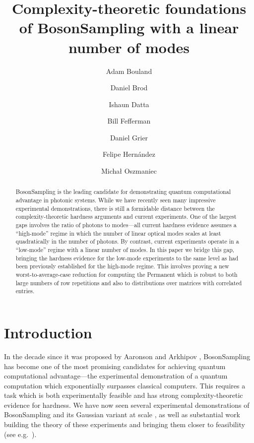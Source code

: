 \documentclass[11pt]{article}
\theoremstyle{plain}
\theoremstyle{plain}
\theoremstyle{plain}
\theoremstyle{plain}
\theoremstyle{plain}
\theoremstyle{plain}
\theoremstyle{plain}
\theoremstyle{remark}
\theoremstyle{remark}
\theoremstyle{plain}
\theoremstyle{plain}
\theoremstyle{plain}
\theoremstyle{plain}
\begin{document}
 	
 \title{Complexity-theoretic foundations of BosonSampling with a linear number of modes}
 \date{}
\author[1]{Adam Bouland}
\author[2]{Daniel Brod}
\author[1]{Ishaun Datta}
\author[3]{Bill Fefferman}
\author[4,5]{Daniel Grier}
\author[6]{Felipe Hern\'{a}ndez}
\author[7,8]{Micha\l{} Oszmaniec}



\maketitle	
\begin{abstract}
    BosonSampling is the leading candidate for demonstrating quantum computational advantage in photonic systems. While we have recently seen many impressive experimental demonstrations, there is still a formidable distance between the complexity-theoretic hardness arguments and current experiments.  One of the largest gaps involves the ratio of photons to modes---all current hardness evidence assumes a ``high-mode'' regime in which the number of linear optical modes scales at least quadratically in the number of photons.  By contrast, current experiments operate in a ``low-mode'' regime with a linear number of modes.  In this paper we bridge this gap, bringing the hardness evidence for the low-mode experiments to the same level as had been previously established for the high-mode regime.  This involves proving a new worst-to-average-case reduction for computing the Permanent which is robust to both large numbers of row repetitions and also to distributions over matrices with correlated entries.
\end{abstract}

\section{Introduction}\label{sec:intro}

In the decade since it was proposed by Aaronson and Arkhipov \cite{Aaronson2013}, BosonSampling has become one of the most promising candidates for achieving quantum computational advantage---the experimental demonstration of a quantum computation which exponentially surpasses classical computers. This requires a task which is both experimentally feasible and has strong complexity-theoretic evidence for hardness. We have now seen several experimental demonstrations of BosonSampling \cite{wang2019boson} and its Gaussian variant at scale \cite{GaussBSExperiment2020, zhong2021phase, madsen2022quantum}, as well as substantial work building the theory of these experiments and bringing them closer to feasibility (see e.g.\ \cite{hamilton2017gaussian,chakhmakhchyan2017boson,deshpande2021quantum,grier_brod_2021}). 
\end{document}
